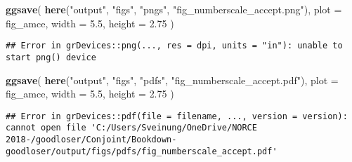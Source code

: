 \documentclass[]{book}
\newenvironment{Shaded}{\begin{snugshade}}{\end{snugshade}}
\newcommand{\KeywordTok}[1]{\textcolor[rgb]{0.13,0.29,0.53}{\textbf{#1}}}
\newcommand{\DataTypeTok}[1]{\textcolor[rgb]{0.13,0.29,0.53}{#1}}
\newcommand{\FloatTok}[1]{\textcolor[rgb]{0.00,0.00,0.81}{#1}}
\newcommand{\StringTok}[1]{\textcolor[rgb]{0.31,0.60,0.02}{#1}}
\newcommand{\NormalTok}[1]{#1}
\begin{document}
\begin{Shaded}
\begin{Highlighting}[]
\KeywordTok{ggsave}\NormalTok{(}
  \KeywordTok{here}\NormalTok{(}\StringTok{"output"}\NormalTok{, }\StringTok{"figs"}\NormalTok{, }\StringTok{"pngs"}\NormalTok{, }\StringTok{"fig_numberscale_accept.png"}\NormalTok{),}
  \DataTypeTok{plot =}\NormalTok{ fig_amce,}
  \DataTypeTok{width =} \FloatTok{5.5}\NormalTok{, }\DataTypeTok{height =} \FloatTok{2.75}
\NormalTok{)}
\end{Highlighting}
\end{Shaded}

\begin{verbatim}
## Error in grDevices::png(..., res = dpi, units = "in"): unable to start png() device
\end{verbatim}

\begin{Shaded}
\begin{Highlighting}[]
\KeywordTok{ggsave}\NormalTok{(}
  \KeywordTok{here}\NormalTok{(}\StringTok{"output"}\NormalTok{, }\StringTok{"figs"}\NormalTok{, }\StringTok{"pdfs"}\NormalTok{, }\StringTok{"fig_numberscale_accept.pdf"}\NormalTok{),}
  \DataTypeTok{plot =}\NormalTok{ fig_amce,}
  \DataTypeTok{width =} \FloatTok{5.5}\NormalTok{, }\DataTypeTok{height =} \FloatTok{2.75}
\NormalTok{)}
\end{Highlighting}
\end{Shaded}

\begin{verbatim}
## Error in grDevices::pdf(file = filename, ..., version = version): cannot open file 'C:/Users/Sveinung/OneDrive/NORCE 2018-/goodloser/Conjoint/Bookdown-goodloser/output/figs/pdfs/fig_numberscale_accept.pdf'
\end{verbatim}
\end{document}
